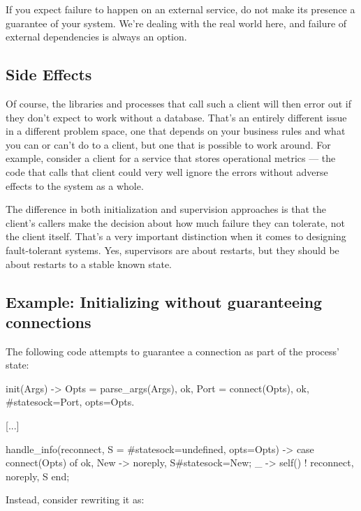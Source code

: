 If you expect failure to happen on an external service, do not make its presence a guarantee of your system. We're dealing with the real world here, and failure of external dependencies is always an option. 

\subsection{Side Effects}
\label{subsec:start-link-side-effects}

Of course, the libraries and processes that call such a client will then error out if they don't expect to work without a database. That's an entirely different issue in a different problem space, one that depends on your business rules and what you can or can't do to a client, but one that is possible to work around. For example, consider a client for a service that stores operational metrics — the code that calls that client could very well ignore the errors without adverse effects to the system as a whole. 

The difference in both initialization and supervision approaches is that the client's callers make the decision about how much failure they can tolerate, not the client itself. That's a very important distinction when it comes to designing fault-tolerant systems. Yes, supervisors are about restarts, but they should be about restarts to a stable known state.

\subsection{Example: Initializing without guaranteeing connections}
\label{subsec:start-link-initializing-without-guaranteeing-connections}

The following code attempts to guarantee a connection as part of the process' state:

\begin{VerbatimText}
init(Args) ->
    Opts = parse_args(Args),
    {ok, Port} = connect(Opts),
    {ok, #state{sock=Port, opts=Opts}}.

[...]

handle_info(reconnect, S = #state{sock=undefined, opts=Opts}) ->
    case connect(Opts) of
        {ok, New} -> {noreply, S#state{sock=New}};
         _ -> self() ! reconnect, {noreply, S}
    end;
\end{VerbatimText}

Instead, consider rewriting it as:

